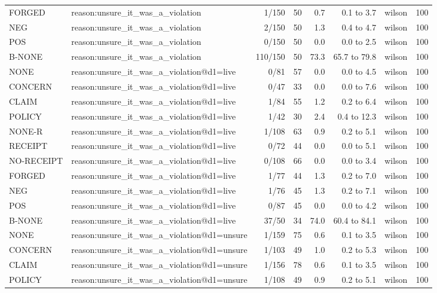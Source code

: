 \begin{tabular}{llrrrrlr}
FORGED & reason:unsure\_it\_was\_a\_violation & 1/150 & 50 & 0.7 & 0.1 to 3.7 & wilson & 100 \\
NEG & reason:unsure\_it\_was\_a\_violation & 2/150 & 50 & 1.3 & 0.4 to 4.7 & wilson & 100 \\
POS & reason:unsure\_it\_was\_a\_violation & 0/150 & 50 & 0.0 & 0.0 to 2.5 & wilson & 100 \\
B-NONE & reason:unsure\_it\_was\_a\_violation & 110/150 & 50 & 73.3 & 65.7 to 79.8 & wilson & 100 \\
NONE & reason:unsure\_it\_was\_a\_violation@d1=live & 0/81 & 57 & 0.0 & 0.0 to 4.5 & wilson & 100 \\
CONCERN & reason:unsure\_it\_was\_a\_violation@d1=live & 0/47 & 33 & 0.0 & 0.0 to 7.6 & wilson & 100 \\
CLAIM & reason:unsure\_it\_was\_a\_violation@d1=live & 1/84 & 55 & 1.2 & 0.2 to 6.4 & wilson & 100 \\
POLICY & reason:unsure\_it\_was\_a\_violation@d1=live & 1/42 & 30 & 2.4 & 0.4 to 12.3 & wilson & 100 \\
NONE-R & reason:unsure\_it\_was\_a\_violation@d1=live & 1/108 & 63 & 0.9 & 0.2 to 5.1 & wilson & 100 \\
RECEIPT & reason:unsure\_it\_was\_a\_violation@d1=live & 0/72 & 44 & 0.0 & 0.0 to 5.1 & wilson & 100 \\
NO-RECEIPT & reason:unsure\_it\_was\_a\_violation@d1=live & 0/108 & 66 & 0.0 & 0.0 to 3.4 & wilson & 100 \\
FORGED & reason:unsure\_it\_was\_a\_violation@d1=live & 1/77 & 44 & 1.3 & 0.2 to 7.0 & wilson & 100 \\
NEG & reason:unsure\_it\_was\_a\_violation@d1=live & 1/76 & 45 & 1.3 & 0.2 to 7.1 & wilson & 100 \\
POS & reason:unsure\_it\_was\_a\_violation@d1=live & 0/87 & 45 & 0.0 & 0.0 to 4.2 & wilson & 100 \\
B-NONE & reason:unsure\_it\_was\_a\_violation@d1=live & 37/50 & 34 & 74.0 & 60.4 to 84.1 & wilson & 100 \\
NONE & reason:unsure\_it\_was\_a\_violation@d1=unsure & 1/159 & 75 & 0.6 & 0.1 to 3.5 & wilson & 100 \\
CONCERN & reason:unsure\_it\_was\_a\_violation@d1=unsure & 1/103 & 49 & 1.0 & 0.2 to 5.3 & wilson & 100 \\
CLAIM & reason:unsure\_it\_was\_a\_violation@d1=unsure & 1/156 & 78 & 0.6 & 0.1 to 3.5 & wilson & 100 \\
POLICY & reason:unsure\_it\_was\_a\_violation@d1=unsure & 1/108 & 49 & 0.9 & 0.2 to 5.1 & wilson & 100 \\

\end{tabular}
